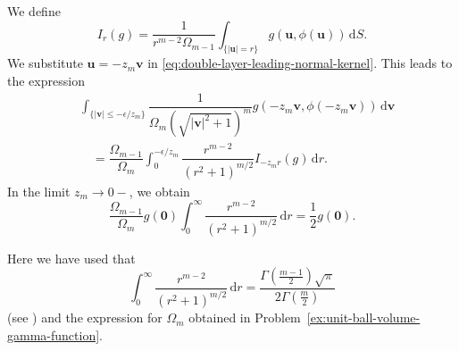 We define
\begin{equation}\label{eq:double-layer-tangential-spherical-mean}
I_r(g)=\dfrac1{r^{m-2}\Omega_{m-1}}\int_{\{|\bm{u}|=r\}}g(\bm{u},\phi(\bm{u}))\,\mathrm{d}S.
\end{equation}
We substitute $\bm{u}=-z_m\bm{v}$ in \eqref{eq:double-layer-leading-normal-kernel}. This leads to the expression
\begin{equation}\label{eq:double-layer-scaled-radial-integral}
\begin{aligned}
&\int_{\{|\bm{v}|\leq-\epsilon/z_m\}}\dfrac1{\Omega_m(\sqrt{|\bm{v}|^2+1})^m}g(-z_m\bm{v},\phi(-z_m\bm{v}))\,\mathrm{d}\bm{v}\\
&\quad=\dfrac{\Omega_{m-1}}{\Omega_m}\int_0^{-\epsilon/z_m}\dfrac{r^{m-2}}{(r^2+1)^{m/2}}I_{-z_mr}(g)\,\mathrm{d}r.
\end{aligned}
\end{equation}
In the limit $z_m\to0-$, we obtain
\begin{equation}\label{eq:double-layer-half-density-jump-limit}
\dfrac{\Omega_{m-1}}{\Omega_m}g(\bm{0})\int_0^\infty\dfrac{r^{m-2}}{(r^2+1)^{m/2}}\,\mathrm{d}r=\dfrac12g(\bm{0}).
\end{equation}


Here we have used that
\begin{equation}\label{eq:double-layer-radial-gamma-integral}
\int_0^\infty\dfrac{r^{m-2}}{(r^2+1)^{m/2}}\,\mathrm{d}r=\dfrac{\Gamma(\frac{m-1}2)\sqrt\pi}{2\Gamma(\frac m2)}
\end{equation}
(see \cite[p.~292]{GR}) and the expression for $\Omega_m$ obtained in Problem~\ref{ex:unit-ball-volume-gamma-function}.
